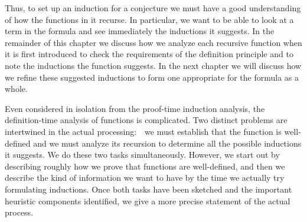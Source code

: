 \documentclass[10pt]{book}
\begin{document}
Thus, to set up an induction for a conjecture we must have a good
understanding of how the functions in it recurse.  In particular, we
want to be able to look at a term in the formula and  see
immediately the inductions it suggests.  In the remainder of this
chapter we discuss how we analyze each recursive function
when it is first introduced  to check the
requirements of the definition principle and to  note the inductions
the function suggests.  In the next chapter we will discuss how we
refine these suggested inductions to form one
appropriate for the formula as a whole.

Even considered in isolation from the proof-time induction analysis,
the definition-time analysis of functions is  complicated.
 Two distinct problems are intertwined in the
actual processing:~~we must establish that the function is well-defined and
we must analyze its recursion to determine all the possible inductions it
suggests.  We do these two tasks simultaneously.
However, we  start out by describing roughly how we
prove that functions are well-defined, and then we  describe the kind of information
we want to have  by the time we actually try formulating
inductions.  Once both tasks have been sketched and the important
heuristic components identified, we  give a more precise statement of
the actual process.
\end{document}
